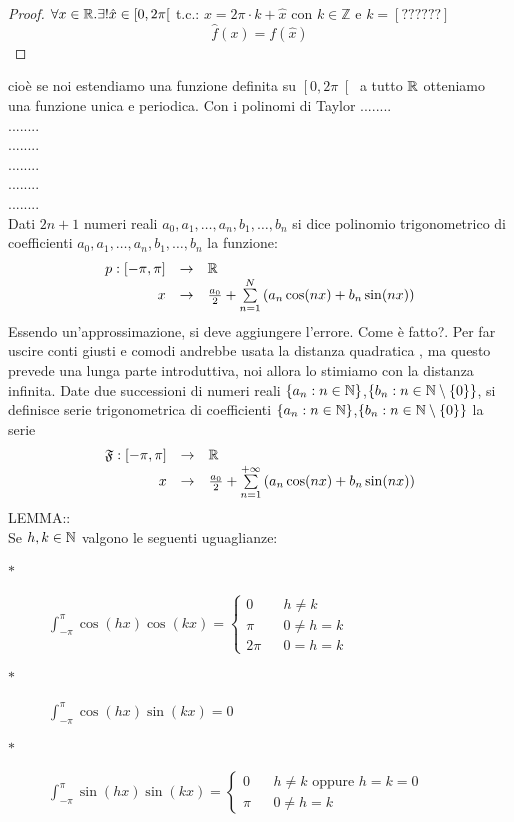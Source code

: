 \begin{proof}
	$\forall x\in \mathbb{R}. \exists ! \hat{x}\in\left[0,2\pi\right[$ t.c.: $x=2\pi\cdot k+\hat{x}$ con $k\in\mathbb{Z}$ e $k=\left[??????\right]$
	\[\hat{f}(x)=f(\hat{x})\]
\end{proof}
cioè se noi estendiamo una funzione definita su $\left[0,2\pi\right[$ a tutto $ \mathbb{R}$ otteniamo una funzione unica e periodica.
\observation
Con i polinomi di Taylor ........\\
........\\
........\\
........\\
........\\
........\\
Dati $2n+1$ numeri reali $a_0,a_1,\dotsc,a_n,b_1,\dotsc,b_n$ si dice polinomio trigonometrico di coefficienti $a_0,a_1,\dotsc,a_n,b_1,\dotsc,b_n$ la funzione:
\[\begin{array}{rcl} p: \left[-\pi,\pi\right] & \to &  \mathbb{R} \\ x & \to & \frac{a_0}{2}+\sum\limits_{n=1}^{N}\left(a_n \cos(nx)+b_n \sin(nx)\right) \end{array}\]
\observation
Essendo un'approssimazione, si deve aggiungere l'errore. Come è fatto?. Per far uscire conti giusti e comodi andrebbe usata la distanza quadratica , ma questo prevede una lunga parte introduttiva, noi allora lo stimiamo con la distanza infinita.
Date due successioni di numeri reali $\left\{a_n:n\in\mathbb{N}\right\}$,$\left\{b_n:n\in\mathbb{N}\setminus\left\{0\right\}\right\}$, si definisce serie trigonometrica di coefficienti  $\left\{a_n:n\in\mathbb{N}\right\}$,$\left\{b_n:n\in\mathbb{N}\setminus\left\{0\right\}\right\}$ la serie
\[\begin{array}{rcl} \mathfrak{F}: \left[-\pi,\pi\right] & \to &  \mathbb{R} \\ x & \to & \frac{a_0}{2}+\sum\limits_{n=1}^{+\infty}\left(a_n \cos(nx)+b_n \sin(nx)\right) \end{array}\]
LEMMA::\\
Se $h,k\in\mathbb{N}$ valgono le seguenti uguaglianze:
\begin{description}
	\item[$\ast$]
	$\int_{-\pi}^{\pi} \cos(hx)\cos(kx)=
	\left\{\begin{matrix}
	0 &&h\ne k\\\pi&&0\ne h=k\\2\pi&&0=h=k
	\end{matrix}\right.$
	\item[$\ast$] $\int_{-\pi}^{\pi}\cos(hx)\sin(kx)= 0 $
	\item[$\ast$]
	$\int_{-\pi}^{\pi}\sin(hx)\sin(kx)=
	\left\{\begin{matrix}
	0 &&h\ne k\text{ oppure }h=k=0\\ \pi&&0\ne h=k
	\end{matrix}\right.$
\end{description}
